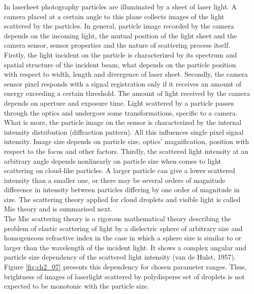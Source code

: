 \documentclass[../main.tex]{subfiles}
\begin{document}
In laserheet photography particles are illuminated by a sheet of laser light. A camera placed at a certain angle to this plane collects images of the light scattered by the particles. In general, particle image recorded by the camera depends on the incoming light, the mutual position of the light sheet and the camera sensor, sensor properties and the nature of scattering process itself. Firstly, the light incident on the particle is characterized by its spectrum and spatial structure of the incident beam, what depends on the particle position with respect to width, length and divergence of laser sheet. Secondly, the camera sensor pixel responds with a signal registration only if it receives an amount of energy exceeding a certain threshold. The amount of light received by the camera depends on aperture and exposure time. Light scattered by a particle passes through the optics and undergoes some transformations, specific to a camera. What is more, the particle image on the sensor is characterized by the internal intensity distribution (diffraction pattern). All this influences single pixel signal intensity. Image size depends on particle size, optics’ magnification, position with respect to the focus and other factors\citep{Olsen2000}. Thirdly, the scattered light intensity at an arbitrary angle depends nonlinearly on particle size when comes to light scattering on cloud-like particles. A larger particle can give a lower scattered intensity than a smaller one, or there may be several orders of magnitude difference in intensity between particles differing by one order of magnitude in size. The scattering theory applied for cloud droplets and visible light is called Mie theory and is summarised next.\\
The Mie scattering theory is a rigorous mathematical theory describing the problem of elastic scattering of light by a dielectric sphere of arbitrary size and homogeneous refractive index in the case in which a sphere size is similar to or larger than the wavelength of the incident light. It shows a complex angular and particle size dependency of the scattered light intensity (van de Hulst, 1957). Figure \ref{fig:ch2_07} presents this dependency for chosen parameter ranges. Thus, brightness of images of laserlight scattered by polydisperse set of droplets is not expected to be monotonic with the particle size.
\end{document}
